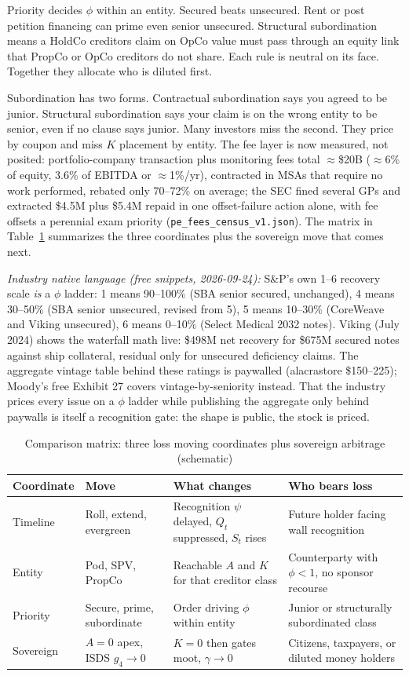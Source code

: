 \documentclass[11pt]{article}
\begin{document}
Priority decides $\phi$ within an entity. Secured beats unsecured. Rent or post petition financing can prime even senior unsecured. Structural subordination means a HoldCo creditors claim on OpCo value must pass through an equity link that PropCo or OpCo creditors do not share. Each rule is neutral on its face. Together they allocate who is diluted first.

Subordination has two forms. Contractual subordination says you agreed to be junior. Structural subordination says your claim is on the wrong entity to be senior, even if no clause says junior. Many investors miss the second. They price by coupon and miss $K$ placement by entity. The fee layer is now measured, not posited: portfolio-company transaction plus monitoring fees total $\approx$\$20B ($\approx$6\% of equity, 3.6\% of EBITDA or $\approx$1\%/yr), contracted in MSAs that require no work performed, rebated only 70--72\% on average; the SEC fined several GPs and extracted \$4.5M plus \$5.4M repaid in one offset-failure action alone, with fee offsets a perennial exam priority (\texttt{pe\_fees\_census\_v1.json}). The matrix in Table~\ref{tab:matrix} summarizes the three coordinates plus the sovereign move that comes next.

\textit{Industry native language (free snippets, 2026-09-24):} S\&P's own 1--6 recovery scale \textit{is} a $\phi$ ladder: 1 means 90--100\% (SBA senior secured, unchanged), 4 means 30--50\% (SBA senior unsecured, revised from 5), 5 means 10--30\% (CoreWeave and Viking unsecured), 6 means 0--10\% (Select Medical 2032 notes). Viking (July 2024) shows the waterfall math live: \$498M net recovery for \$675M secured notes against ship collateral, residual only for unsecured deficiency claims. The aggregate vintage table behind these ratings is paywalled (alacrastore \$150--225); Moody's free Exhibit 27 covers vintage-by-seniority instead. That the industry prices every issue on a $\phi$ ladder while publishing the aggregate only behind paywalls is itself a recognition gate: the shape is public, the stock is priced.

\begin{table}[h]
\centering
\small
\caption{Comparison matrix: three loss moving coordinates plus sovereign arbitrage (schematic)}
\label{tab:matrix}
\begin{tabular}{p{2.1cm}p{3.2cm}p{2.2cm}p{3.4cm}}
\toprule
Coordinate & Move & What changes & Who bears loss \\
\midrule
Timeline & Roll, extend, evergreen & Recognition $\psi$ delayed, $Q_t$ suppressed, $S_t$ rises & Future holder facing wall recognition \\
Entity & Pod, SPV, PropCo & Reachable $A$ and $K$ for that creditor class & Counterparty with $\phi<1$, no sponsor recourse \\
Priority & Secure, prime, subordinate & Order driving $\phi$ within entity & Junior or structurally subordinated class \\
Sovereign & $A=0$ apex, ISDS $g_4\to0$ & $K=0$ then gates moot, $\gamma\to0$ & Citizens, taxpayers, or diluted money holders \\
\bottomrule
\end{tabular}
\end{table}
\end{document}

